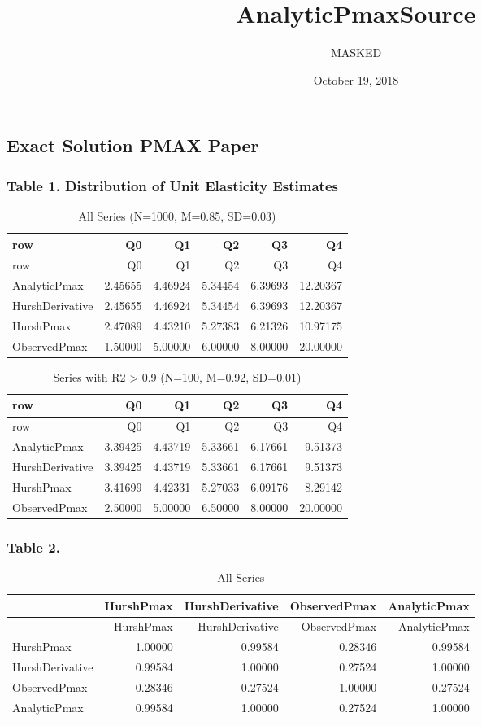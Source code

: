 \documentclass[]{article}
\title{AnalyticPmaxSource}
\author{MASKED}
\date{October 19, 2018}
\begin{document}
\maketitle

\subsection{Exact Solution PMAX Paper}\label{exact-solution-pmax-paper}

\subsubsection{Table 1. Distribution of Unit Elasticity
Estimates}\label{table-1.-distribution-of-unit-elasticity-estimates}

\begin{longtable}[]{@{}lrrrrr@{}}
\caption{All Series (N=1000, M=0.85, SD=0.03)}\tabularnewline
\toprule
row & Q0 & Q1 & Q2 & Q3 & Q4\tabularnewline
\midrule
\endfirsthead
\toprule
row & Q0 & Q1 & Q2 & Q3 & Q4\tabularnewline
\midrule
\endhead
AnalyticPmax & 2.45655 & 4.46924 & 5.34454 & 6.39693 &
12.20367\tabularnewline
HurshDerivative & 2.45655 & 4.46924 & 5.34454 & 6.39693 &
12.20367\tabularnewline
HurshPmax & 2.47089 & 4.43210 & 5.27383 & 6.21326 &
10.97175\tabularnewline
ObservedPmax & 1.50000 & 5.00000 & 6.00000 & 8.00000 &
20.00000\tabularnewline
\bottomrule
\end{longtable}

\begin{longtable}[]{@{}lrrrrr@{}}
\caption{Series with R2 \textgreater{} 0.9 (N=100, M=0.92,
SD=0.01)}\tabularnewline
\toprule
row & Q0 & Q1 & Q2 & Q3 & Q4\tabularnewline
\midrule
\endfirsthead
\toprule
row & Q0 & Q1 & Q2 & Q3 & Q4\tabularnewline
\midrule
\endhead
AnalyticPmax & 3.39425 & 4.43719 & 5.33661 & 6.17661 &
9.51373\tabularnewline
HurshDerivative & 3.39425 & 4.43719 & 5.33661 & 6.17661 &
9.51373\tabularnewline
HurshPmax & 3.41699 & 4.42331 & 5.27033 & 6.09176 &
8.29142\tabularnewline
ObservedPmax & 2.50000 & 5.00000 & 6.50000 & 8.00000 &
20.00000\tabularnewline
\bottomrule
\end{longtable}

\subsubsection{Table 2.}\label{table-2.}

\begin{longtable}[]{@{}lrrrr@{}}
\caption{All Series}\tabularnewline
\toprule
& HurshPmax & HurshDerivative & ObservedPmax &
AnalyticPmax\tabularnewline
\midrule
\endfirsthead
\toprule
& HurshPmax & HurshDerivative & ObservedPmax &
AnalyticPmax\tabularnewline
\midrule
\endhead
HurshPmax & 1.00000 & 0.99584 & 0.28346 & 0.99584\tabularnewline
HurshDerivative & 0.99584 & 1.00000 & 0.27524 & 1.00000\tabularnewline
ObservedPmax & 0.28346 & 0.27524 & 1.00000 & 0.27524\tabularnewline
AnalyticPmax & 0.99584 & 1.00000 & 0.27524 & 1.00000\tabularnewline
\bottomrule
\end{longtable}
\end{document}
